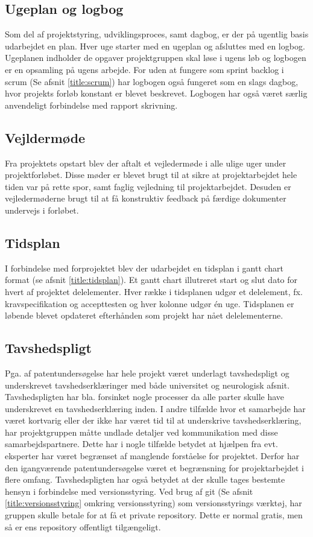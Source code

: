 \subsection{Ugeplan og logbog}
Som del af projektstyring, udviklingsproces, samt dagbog, er der på ugentlig basis udarbejdet en plan. Hver uge starter med en ugeplan og afsluttes med en logbog. Ugeplanen indholder de opgaver projektgruppen skal løse i ugens løb og logbogen er en opsamling på ugens arbejde. For uden at fungere som sprint backlog i scrum (Se afsnit \ref{title:scrum}) har logbogen også fungeret som en slags dagbog, hvor projekts forløb konstant er blevet beskrevet. Logbogen har også været særlig anvendeligt forbindelse med rapport skrivning. 

\subsection{Vejldermøde}
Fra projektets opstart blev der aftalt et vejledermøde i alle ulige uger under projektforløbet. Disse møder er blevet brugt til at sikre at projektarbejdet hele tiden var på rette spor, samt faglig vejledning til projektarbejdet. Desuden er vejledermøderne brugt til at få konstruktiv feedback på færdige dokumenter undervejs i forløbet. 

\subsection{Tidsplan}
I forbindelse med forprojektet blev der udarbejdet en tidsplan i gantt chart format (se afsnit \ref{title:tidsplan}). Et gantt chart illutreret start og slut dato for hvert af projektet delelementer. Hver række i tidsplanen udgør et delelement, fx. kravspecifikation og accepttesten og hver kolonne udgør én uge. Tidsplanen er løbende blevet opdateret efterhånden som projekt har nået delelementerne. 

\subsection{Tavshedspligt} \label{title:tavshedspligt}
Pga. af patentundersøgelse har hele projekt været underlagt tavshedspligt og underskrevet tavshedserklæringer med både universitet og neurologisk afsnit. Tavshedspligten har bla. forsinket nogle processer da alle parter skulle have underskrevet en tavshedserklæring inden. I andre tilfælde hvor et samarbejde har været kortvarig eller der ikke har været tid til at underskrive tavshedserklæring, har projektgruppen måtte undlade detaljer ved kommunikation med disse samarbejdspartnere. Dette har i nogle tilfælde betydet at hjælpen fra evt. eksperter har været begrænset af manglende forståelse for projektet.  Derfor har den igangværende patentundersøgelse været et begrænsning for projektarbejdet i flere omfang. 
Tavshedspligten har også betydet at der skulle tages bestemte hensyn i forbindelse med versionsstyring. Ved brug af git (Se afsnit \ref{title:versionsstyring} omkring versionsstyring) som versionsstyrings værktøj, har gruppen skulle betale for at få et private repository. Dette er normal gratis, men så er ens repository offentligt tilgængeligt. 


